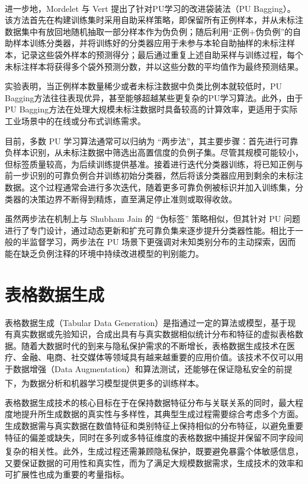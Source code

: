 进一步地，Mordelet 与 Vert\textsuperscript{\cite{mordelet2013bagging}} 提出了针对PU学习的改进袋装法（PU Bagging）。该方法首先在构建训练集时采用自助采样策略，即保留所有正例样本，并从未标注数据集中有放回地随机抽取一部分样本作为伪负例；随后利用“正例+伪负例”的自助样本训练分类器，并将训练好的分类器应用于未参与本轮自助抽样的未标注样本，记录这些袋外样本的预测得分；最后通过重复上述自助采样与训练过程，每个未标注样本将获得多个袋外预测分数，并以这些分数的平均值作为最终预测结果。

实验表明，当正例样本数量稀少或者未标注数据中负类比例本就较低时，PU Bagging方法往往表现优异，甚至能够超越某些更复杂的PU学习算法。此外，由于PU Bagging方法在处理大规模未标注数据时具备较高的计算效率，更适用于实际工业场景中的在线或分布式训练需求。

目前，多数 PU 学习算法通常可以归纳为 “两步法”，其主要步骤：首先进行可靠负样本识别，从未标注数据中筛选出高置信度的负例子集。尽管其规模可能较小，但标签质量较高，为后续训练提供基准。接着进行迭代分类器训练，将已知正例与前一步识别的可靠负例合并训练初始分类器，然后将该分类器应用到剩余的未标注数据。这个过程通常会进行多次迭代，随着更多可靠负例被标识并加入训练集，分类器的决策边界不断得到精炼，直至满足停止准则或取得收敛。

虽然两步法在机制上与 Shubham Jain 的 “伪标签” 策略相似，但其针对 PU 问题进行了专门设计，通过动态更新和扩充可靠负集来逐步提升分类器性能。相比于一般的半监督学习，两步法在 PU 场景下更强调对未知类别分布的主动探索，因而能在缺乏负例注释的环境中持续改进模型的判别能力。
\section{表格数据生成}
表格数据生成（Tabular Data Generation）是指通过一定的算法或模型，基于现有真实数据或先验知识，合成出具有与真实数据相似统计分布和特征的虚拟表格数据。随着大数据时代的到来与隐私保护需求的不断增长，表格数据生成技术在医疗、金融、电商、社交媒体等领域具有越来越重要的应用价值。该技术不仅可以用于数据增强（Data Augmentation）和算法测试，还能够在保证隐私安全的前提下，为数据分析和机器学习模型提供更多的训练样本\textsuperscript{\cite{li2021survey}}。

表格数据生成技术的核心目标在于在保持数据特征分布与关联关系的同时，最大程度地提升所生成数据的真实性与多样性，其典型生成过程需要综合考虑多个方面。生成数据需与真实数据在数值特征和类别特征上保持相似的分布特征，以避免重要特征的偏差或缺失，同时在多列或多特征维度的表格数据中捕捉并保留不同字段间复杂的相关性\textsuperscript{\cite{zhang2020tab}}。此外，生成过程还需兼顾隐私保护，既要避免暴露个体敏感信息，又要保证数据的可用性和真实性，而为了满足大规模数据需求，生成技术的效率和可扩展性也成为重要的考量指标。

